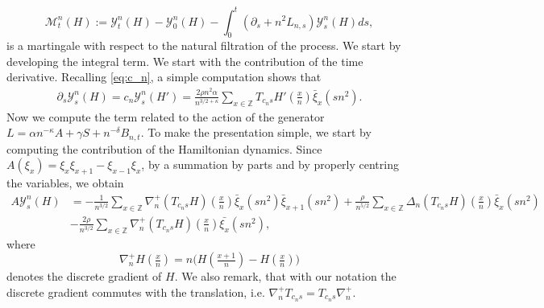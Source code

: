 \documentclass[a4paper, reqno, 12pt]{amsart}
\theoremstyle{plain}
\theoremstyle{definition}
\begin{document}
\begin{equation} \label{eq:martingaledecomp}
   \mathcal M^n_t(H) := \mathcal{Y}^n_t(H) - \mathcal{Y}^n_0(H) - \int_0^t (\partial_s + n^2L_{n,s})\mathcal{Y}^n_s(H) ds,
\end{equation}
is a martingale with respect to the natural filtration of the process. We start by developing the integral term. We start with the contribution of the time derivative.  Recalling \eqref{eq:c_n}, a simple computation shows that  
\begin{align*}
    \partial_s\mathcal{Y}^n_s(H) = c_n \mathcal{Y}^n_s(H')=\frac{2\rho n^2 \alpha}{n^{3/2+\kappa}}\sum_{x\in\mathbb{Z}} T_{c_n s} H'(\tfrac{x}{n}) {\bar\xi_x}(sn^2).
\end{align*}
Now we compute the term related to the action of the generator ${L} = \alpha n^{-\kappa}A +\gamma S + n^{-\delta}B_{n,t}$. To make the presentation simple, we  start by computing the contribution of the Hamiltonian dynamics. Since $A(\xi_x)= \xi_x\xi_{x+1} -\xi_{x-1}\xi_x$, by a summation by parts and by properly centring the variables, we obtain 
\begin{align*}
A \mathcal{Y}_s^n(H) &= 
     -\frac{1}{n^{3/2}} \sum_{x\in\mathbb{Z}} \nabla_n^+(T_{c_n s}H)(\tfrac{x} {n}) {\bar\xi_x} (sn^2){\bar\xi_{x+1}} (sn^2)+ \frac{\rho}{n^{5/2}} \sum_{x\in\mathbb{Z}} \Delta_n (T_{c_n s}H)(\tfrac{x}{n}) {\bar\xi_x}(sn^2) \\   &- \frac{2\rho}{n^{3/2}} \sum_{x\in\mathbb{Z}} \nabla_n^+(T_{c_ ns}H)(\tfrac{x}{n}) \bar{\xi_x}(sn^2),
\end{align*}
where $$\nabla_n^+H(\tfrac xn)=n\big(H(\tfrac{x+1}{n}) - H(\tfrac xn)\big)$$ denotes the discrete gradient of $H$. We also remark, that with our notation the discrete gradient commutes with the translation, i.e. $\nabla^+_nT_{c_n s} = T_{c_ns}\nabla^+_n$.
\end{document}
